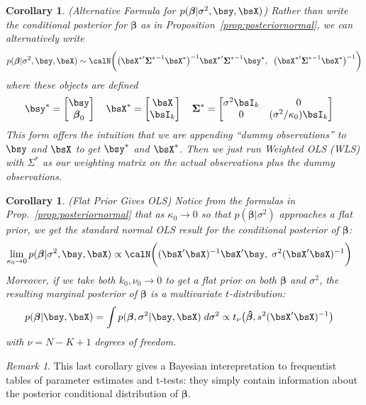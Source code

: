 \documentclass[12pt]{article}
\theoremstyle{plain}
\newtheorem{cor}[thm]{Corollary}
\theoremstyle{definition}
\theoremstyle{remark}
\newtheorem*{rmk}{Remark}
\newcommand{\ra}{\rightarrow}
\newcommand{\bsSigma}{\boldsymbol{\Sigma}}
\newcommand{\bsbeta}{\boldsymbol{\beta}}
\newcommand{\bshatbeta}{\boldsymbol{\hat{\beta}}}
\begin{document}
\begin{cor}
\emph{(Alternative Formula for $p(\bsbeta|\sigma^2,\bsy,\bsX)$)}
Rather than write the conditional posterior for $\bsbeta$ as in
Proposition~\ref{prop:posteriornormal}, we can alternatively write
\begin{align*}
  p(\bsbeta | \sigma^2, \bsy, \bsX)
  \sim
  \calN\bigg(
  \big(
  {\bsX^*}'
  {\bsSigma^*}^{-1}
  \bsX^*
  \big)^{-1}
  {\bsX^*}'{\bsSigma^*}^{-1} \bsy^*,\;\;
  \big(
  {\bsX^*}'
  {\bsSigma^*}^{-1}
  \bsX^*
  \big)^{-1}
  \bigg)
\end{align*}
where these objects are defined
\begin{align*}
  \bsy^*=
  \begin{bmatrix}
    \bsy \\ \bsbeta_0
  \end{bmatrix}
  \quad
  \bsX^*=
  \begin{bmatrix}
    \bsX \\ \bsI_k
  \end{bmatrix}
  \quad
  \bsSigma^*=
  \begin{bmatrix}
    \sigma^2\bsI_k & 0 \\
    0 &  (\sigma^2/\kappa_0)\bsI_k
  \end{bmatrix}
  \quad
\end{align*}
This form offers the intuition that we are appending ``dummy
observations'' to $\bsy$ and $\bsX$ to get $\bsy^*$ and $\bsX^*$. Then
we just run Weighted OLS (WLS) with $\Sigma^*$ as our weighting matrix
on the actual observations plus the dummy observations.
\end{cor}


\begin{cor}\emph{(Flat Prior Gives OLS)}
\label{cor:flatpriorols}
Notice from the formulas in Prop.~\ref{prop:posteriornormal} that as
$\kappa_0\ra 0$ so that $p(\bsbeta|\sigma^2)$ approaches a flat prior,
we get the standard normal OLS result for the conditional posterior of
$\bsbeta$:
\begin{align*}
  \lim_{\kappa_0\ra 0}
  p(\bsbeta | \sigma^2, \bsy, \bsX)
  &\propto
  \calN\bigg(
  (\bsX'\bsX)^{-1}
  \bsX'\bsy,\;
  \sigma^2(\bsX'\bsX)^{-1}
  \bigg)
\end{align*}
Moreover, if we take both $k_0,\nu_0\ra 0$ to get a flat prior on both
$\bsbeta$ and $\sigma^2$, the resulting marginal posterior of $\bsbeta$
is a multivariate $t$-distribution:
\begin{align*}
  p(\bsbeta|\bsy,\bsX)
  &= \int p(\bsbeta,\sigma^2| \bsy,\bsX) \; d\sigma^2
  \propto
  t_\nu\big(\bshatbeta,s^2(\bsX'\bsX)^{-1}\big)
\end{align*}
with $\nu=N-K+1$ degrees of freedom.
\end{cor}
\begin{rmk}
This last corollary gives a Bayesian interepretation to frequentist
tables of parameter estimates and t-tests: they simply contain
information about the posterior conditional distribution of $\bsbeta$.
\end{rmk}
\end{document}
